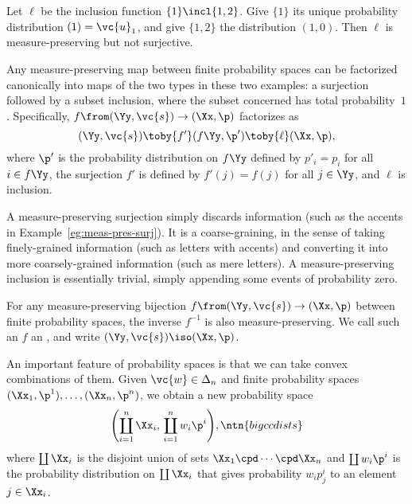 \begin{example}
Let $\ell$ be the inclusion function $\{1\} \incl \{1, 2\}$.  Give $\{1\}$
its unique probability distribution $(1) = \vc{u}_1$, and give $\{1, 2\}$
the distribution $(1, 0)$.  Then $\ell$ is measure-preserving but not
surjective. 
\end{example}

Any measure-preserving map between finite probability spaces can be
factorized%
%
%  
canonically into maps of the two types in these two examples: a
surjection followed by a subset inclusion, where the subset concerned has
total probability~$1$.  Specifically, $f \from (\Yy, \vc{s}) \to (\Xx, \p)$
factorizes as
\[
(\Yy, \vc{s}) \toby{f'} (f\Yy, \p') \toby{\ell} (\Xx, \p),
\]
where $\p'$ is the probability distribution on $f\Yy$ defined by
$p'_i = p_i$ for all $i \in f\Yy$, the surjection $f'$ is defined by $f'(j)
= f(j)$ for all $j \in \Yy$, and $\ell$ is inclusion.  

A measure-preserving surjection simply discards information (such as the
accents in Example~\ref{eg:meas-pres-surj}).  It is a coarse-graining, in
the sense of taking finely-grained information (such as letters with
accents) and converting it into more coarsely-grained information (such as
mere letters).
% 
A measure-preserving inclusion is essentially trivial, simply
appending some events of probability zero.

For any measure-preserving bijection $f \from (\Yy, \vc{s}) \to (\Xx, \p)$
between finite probability spaces, the inverse $f^{-1}$ is also
measure-preserving.  We call such an $f$ an ,%
%
%
% 
and write $(\Yy, \vc{s}) \iso (\Xx, \p)$.

An important feature of probability spaces is that we can take convex%
%
%
% 
combinations of them.  Given $\vc{w} \in \Delta_n$ and finite probability
spaces $(\Xx_1, \p^1), \ldots, (\Xx_n, \p^n)$, we obtain a new probability
space
% 
\[
\Biggl(
\coprod_{i = 1}^n \Xx_i, 
\,
\coprod_{i = 1}^n w_i \p^i
\Biggr),
\ntn{bigccdists}
\]
% 
where $\coprod \Xx_i$ is the disjoint union of sets $\Xx_1 \cpd
\cdots \cpd \Xx_n$ and $\coprod w_i \p^i$ is the probability distribution
on $\coprod \Xx_i$ that gives probability $w_i p^i_j$ to an element $j \in
\Xx_i$.

